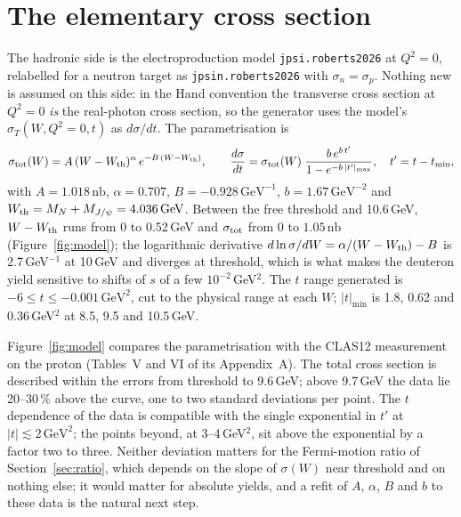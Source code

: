 \documentclass[11pt,a4paper]{article}
\newcommand{\jpsi}{J/\psi}
\newcommand{\nb}{\,\mathrm{nb}}
\newcommand{\GeV}{\,\mathrm{GeV}}
\begin{document}
\section{The elementary cross section}
\label{sec:model}

The hadronic side is the electroproduction model \texttt{jpsi.roberts2026} at $Q^2=0$, relabelled for
a neutron target as \texttt{jpsin.roberts2026} with $\sigma_n=\sigma_p$.  Nothing new is assumed on
this side: in the Hand convention the transverse cross section at $Q^2=0$ \emph{is} the real-photon
cross section, so the generator uses the model's $\sigma_T(W,Q^2\!=\!0,t)$ as $d\sigma/dt$.  The
parametrisation is
\begin{equation}
\sigma_{\rm tot}(W)=A\,(W-W_{\rm th})^{\alpha}\,e^{-B\,(W-W_{\rm th})},\qquad
\frac{d\sigma}{dt}=\sigma_{\rm tot}(W)\;\frac{b\,e^{b\,t'}}{1-e^{-b\,|t'|_{\max}}},\quad t'=t-t_{\min},
\end{equation}
with $A=1.018\nb$, $\alpha=0.707$, $B=-0.928\GeV^{-1}$, $b=1.67\GeV^{-2}$ and $W_{\rm th}=M_N+M_{\jpsi}
=4.036\GeV$.  Between the free threshold and 10.6\,GeV, $W-W_{\rm th}$ runs from 0 to 0.52\,GeV and
$\sigma_{\rm tot}$ from 0 to $1.05\nb$ (Figure~\ref{fig:model}); the logarithmic derivative
$d\ln\sigma/dW=\alpha/(W-W_{\rm th})-B$ is 2.7\,GeV$^{-1}$ at 10\,GeV and diverges at threshold, which
is what makes the deuteron yield sensitive to shifts of $s$ of a few $10^{-2}$\,GeV$^2$.  The $t$ range
generated is $-6\le t\le-0.001\GeV^2$, cut to the physical range at each $W$; $|t|_{\min}$ is 1.8,
0.62 and 0.36\,GeV$^2$ at 8.5, 9.5 and 10.5\,GeV.

Figure~\ref{fig:model} compares the parametrisation with the CLAS12 measurement on the proton
\cite{clas12jpsi} (Tables~V and VI of its Appendix~A).  The total cross section is described within
the errors from threshold to 9.6\,GeV; above 9.7\,GeV the data lie 20--30\,\% above the curve, one to
two standard deviations per point.  The $t$ dependence of the data is compatible with the single
exponential in $t'$ at $|t|\lesssim2\GeV^2$; the points beyond, at 3--4\,GeV$^2$, sit above the
exponential by a factor two to three.  Neither deviation matters for the Fermi-motion ratio of
Section~\ref{sec:ratio}, which depends on the slope of $\sigma(W)$ near threshold and on nothing
else; it would matter for absolute yields, and a refit of $A$, $\alpha$, $B$ and $b$ to these data is
the natural next step.
\end{document}
